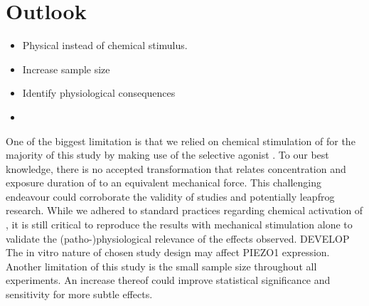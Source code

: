 \chapter{Outlook}

\begin{itemize}
	\item Physical instead of chemical stimulus. 
	\item Increase sample size
	\item Identify physiological consequences
	\item 
\end{itemize}

One of the biggest limitation is that we relied on chemical stimulation of \Piezo{} for the majority of this study by making use of the selective \Piezo{} agonist \Yoda{}. To our best knowledge, there is no accepted transformation that relates concentration and exposure duration of \Yoda{} to an equivalent mechanical force. This challenging endeavour could corroborate the validity of \Yoda{} studies and potentially leapfrog \Piezo{} research. While we adhered to standard practices regarding chemical activation of \Piezo{}\cite{Morley2018}, it is still critical to reproduce the results with mechanical stimulation alone to validate the (patho-)physiological relevance of the effects observed. DEVELOP The in vitro nature of chosen study design may affect PIEZO1 expression. 
Another limitation of this study is the small sample size throughout all experiments. An increase thereof could improve statistical significance and sensitivity for more subtle effects.\\



